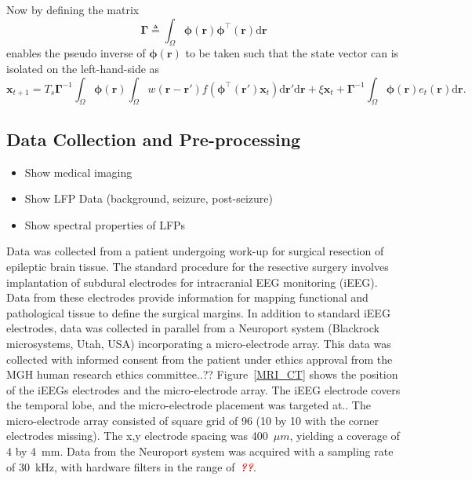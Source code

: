 \documentclass[]{article}
\newcommand{\dean}[1]{\textsf{\emph{\textbf{\textcolor{red}{#1}}}}}
\begin{document}
Now by defining the matrix
\begin{equation}\label{eq:DefGamma}
	\boldsymbol{\Gamma} \triangleq \int_\Omega {\boldsymbol{\phi} \left(\mathbf{r}\right)\boldsymbol{\phi} ^{\top}\left(\mathbf{r}\right)\textrm{d}\mathbf{r}} 
\end{equation}
enables the pseudo inverse of $\boldsymbol{\phi(\mathbf{r})}$ to be taken such that the state vector can is isolated on the left-hand-side as
\begin{equation}\label{eq:ReducedForm}
	 \mathbf{x}_{t+1} = T_s\boldsymbol{\Gamma}^{-1}
	 \int_\Omega \boldsymbol{\phi}(\mathbf{r}) 
	 \int_\Omega w(\mathbf{r}-\mathbf{r}')f(\boldsymbol{\phi}^{\top}(\mathbf{r}')\mathbf{x}_t) \textrm{d}\mathbf{r}' \textrm{d}\mathbf{r} 
	 + \xi\mathbf{x}_t + \boldsymbol{\Gamma}^{-1} \int_\Omega{\boldsymbol{\phi}(\mathbf{r}) e_t(\mathbf{r})\textrm{d}\mathbf{r}}.
\end{equation}
\subsection{Data Collection and Pre-processing}
\begin{itemize}
	\item Show medical imaging
	\item Show LFP Data (background, seizure, post-seizure)
	\item Show spectral properties of LFPs
\end{itemize}

Data was collected from a patient undergoing work-up for surgical resection of epileptic brain tissue. The standard procedure for the resective surgery involves implantation of subdural electrodes for intracranial EEG monitoring (iEEG). Data from these electrodes provide information for mapping functional and pathological tissue to define the surgical margins. In addition to standard iEEG electrodes, data was collected in parallel from a Neuroport system (Blackrock microsystems, Utah, USA) incorporating a micro-electrode array. This data was collected with informed consent from the patient under ethics approval from the MGH human research ethics committee..?? Figure~\ref{MRI_CT} shows the position of the iEEGs electrodes and the micro-electrode array. The iEEG electrode covers the temporal lobe, and the micro-electrode placement was targeted at.. The micro-electrode array consisted of square grid of 96 (10 by 10 with the corner electrodes missing). The x,y electrode spacing was 400~$\mu m$, yielding a coverage of 4 by 4~mm. Data from the Neuroport system was acquired with a sampling rate of 30~kHz, with hardware filters in the range of~\dean{??}. 
\end{document}
